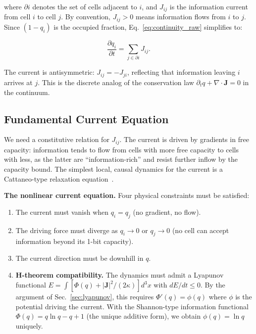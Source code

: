 \documentclass[aps,prd,twocolumn,showpacs,superscriptaddress,preprintnumbers]{revtex4-2}
\begin{document}
where $\partial i$ denotes the set of cells adjacent to $i$, and $J_{ij}$ is the information current from cell $i$ to cell $j$.
By convention, $J_{ij}>0$ means information flows from $i$ to $j$.
Since $(1-q_i)$ is the occupied fraction, Eq.~\eqref{eq:continuity_raw} simplifies to:

\begin{equation}
\boxed{\frac{\partial q_i}{\partial t} = \sum_{j \in \partial i} J_{ij}}.
\label{eq:continuity}
\end{equation}

The current is antisymmetric: $J_{ij}=-J_{ji}$, reflecting that information leaving $i$ arrives at $j$.
This is the discrete analog of the conservation law $\partial_t q + \nabla\cdot\mathbf{J}=0$ in the continuum.

\subsection{Fundamental Current Equation}

We need a constitutive relation for $J_{ij}$.
The current is driven by gradients in free capacity: information tends to flow from cells with more free capacity to cells with less, as the latter are ``information-rich'' and resist further inflow by the capacity bound.
The simplest local, causal dynamics for the current is a Cattaneo-type relaxation equation~\cite{Cattaneo:1948,Jou:2010}.

\textbf{The nonlinear current equation.}
Four physical constraints must be satisfied:
\begin{enumerate}
    \item The current must vanish when $q_i=q_j$ (no gradient, no flow).
    \item The driving force must diverge as $q_i\to0$ or $q_j\to0$ (no cell can accept information beyond its 1-bit capacity).
    \item The current direction must be downhill in $q$.
    \item \textbf{H-theorem compatibility.} The dynamics must admit a Lyapunov functional $E = \int [\Phi(q) + |\mathbf{J}|^2/(2\kappa)] d^3x$ with $dE/dt \le 0$. By the argument of Sec.~\ref{sec:lyapunov}, this requires $\Phi'(q) = \phi(q)$ where $\phi$ is the potential driving the current. With the Shannon-type information functional $\Phi(q) = q\ln q - q + 1$ (the unique additive form), we obtain $\phi(q) = \ln q$ uniquely.
\end{enumerate}
\end{document}
